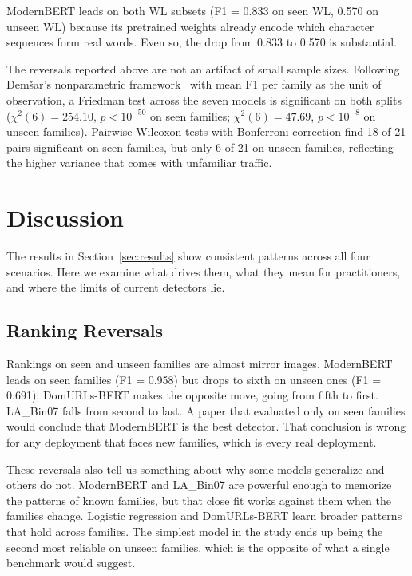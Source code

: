 \documentclass[conference]{IEEEtran}
\begin{document}
ModernBERT leads on both WL subsets (F1 = 0.833 on seen WL, 0.570 on unseen WL) because its pretrained weights already encode which character sequences form real words. Even so, the drop from 0.833 to 0.570 is substantial.

The reversals reported above are not an artifact of small sample sizes. Following Dem\v{s}ar's nonparametric framework~\cite{demvsar2006statistical} with mean F1 per family as the unit of observation, a Friedman test across the seven models is significant on both splits ($\chi^2(6) = 254.10$, $p < 10^{-50}$ on seen families; $\chi^2(6) = 47.69$, $p < 10^{-8}$ on unseen families). Pairwise Wilcoxon tests with Bonferroni correction find 18 of 21 pairs significant on seen families, but only 6 of 21 on unseen families, reflecting the higher variance that comes with unfamiliar traffic.

\section{Discussion}
\label{sec:discussion}

The results in Section~\ref{sec:results} show consistent patterns across all four scenarios. Here we examine what drives them, what they mean for practitioners, and where the limits of current detectors lie.

\subsection{Ranking Reversals}

Rankings on seen and unseen families are almost mirror images. ModernBERT leads on seen families (F1 = 0.958) but drops to sixth on unseen ones (F1 = 0.691); DomURLs-BERT makes the opposite move, going from fifth to first. LA\_Bin07 falls from second to last. A paper that evaluated only on seen families would conclude that ModernBERT is the best detector. That conclusion is wrong for any deployment that faces new families, which is every real deployment.

These reversals also tell us something about why some models generalize and others do not. ModernBERT and LA\_Bin07 are powerful enough to memorize the patterns of known families, but that close fit works against them when the families change. Logistic regression and DomURLs-BERT learn broader patterns that hold across families. The simplest model in the study ends up being the second most reliable on unseen families, which is the opposite of what a single benchmark would suggest.
\end{document}
